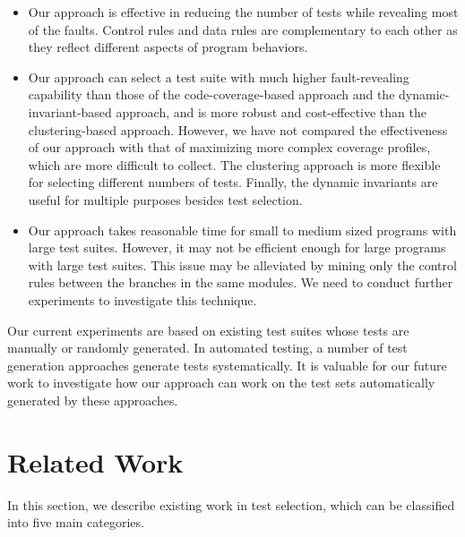 \documentclass{sig-alternate}
\begin{document}
\begin{itemize}
\item \vspace{-0.1in}
Our approach is effective in reducing the number of tests while
revealing most of the faults. Control rules and data rules are
complementary to each other as they reflect different aspects of
program behaviors.


\item \vspace{-0.1in}
Our approach can select a test suite with much higher
fault-revealing capability than those of the code-coverage-based
approach and the dynamic-invariant-based approach, and is more
robust and cost-effective than the clustering-based approach.
However, we have not compared the effectiveness of our approach with
that of maximizing more complex coverage profiles, which are more
difficult to collect. The clustering approach is more flexible for
selecting different numbers of tests. Finally, the dynamic
invariants are useful for multiple purposes besides test selection.
\item \vspace{-0.1in}
Our approach takes reasonable time for small to medium sized
programs with large test suites. However, it may not be efficient
enough for large programs with large test suites. This issue may be
alleviated by mining only the control rules between the branches in
the same modules. We need to conduct further experiments to
investigate this technique.
\end{itemize} \vspace{-0.1in}
Our current experiments are based on existing test suites whose
tests are manually or randomly generated. In automated testing, a
number of test generation approaches generate tests systematically.
It is valuable for our future work to investigate how our approach
can work on the test sets automatically generated by these
approaches.




\vspace{-0.15in}

\section{Related Work} \label{sec:relatedwork}

In this section, we describe existing work in test selection, which
can be classified into five main categories.
\end{document}
